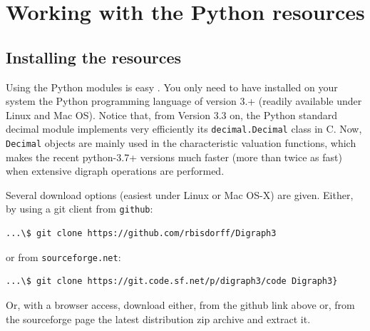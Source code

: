 %
%
%
\chapter{Working with the \Digraph Python resources}
\label{sec:1} %

\abstract*{}

\abstract{}

\section{Installing the \Digraph resources}
\label{sec:1.1}

Using the \Digraph Python modules is easy \citep{BIS-2021}. You only need to have installed on your system the Python programming language of version 3.+ (readily available under Linux and Mac OS). Notice that, from Version 3.3 on, the Python standard decimal module implements very efficiently its \texttt{decimal.Decimal} class in C. Now, \texttt{Decimal} objects are mainly used in the \Digraph characteristic valuation functions, which makes the recent python-3.7+ versions much faster (more than twice as fast) when extensive digraph operations are performed.

Several download options (easiest under Linux or Mac OS-X) are given. Either, by using a git client from \texttt{github}:
\begin{footnotesize}
\begin{verbatim}
...\$ git clone https://github.com/rbisdorff/Digraph3
\end{verbatim}
\end{footnotesize}
or from \texttt{sourceforge.net}:
\begin{footnotesize}
\begin{verbatim}
...\$ git clone https://git.code.sf.net/p/digraph3/code Digraph3}
\end{verbatim}
\end{footnotesize}
Or, with a browser access, download either, from the github link above or, from the sourceforge page the latest distribution zip archive and extract it.

